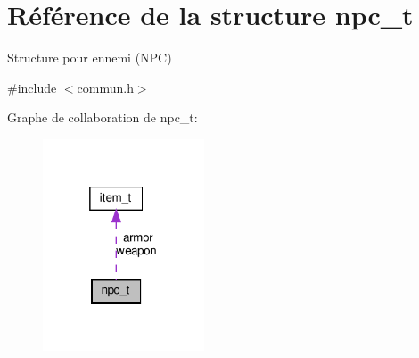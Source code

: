 \hypertarget{structnpc__t}{}\section{Référence de la structure npc\+\_\+t}
\label{structnpc__t}


Structure pour ennemi (N\+PC)  




{\ttfamily \#include $<$commun.\+h$>$}



Graphe de collaboration de npc\+\_\+t\+:\nopagebreak
\begin{figure}[H]
\begin{center}
\leavevmode
\includegraphics[width=136pt]{structnpc__t__coll__graph}
\end{center}
\end{figure}
